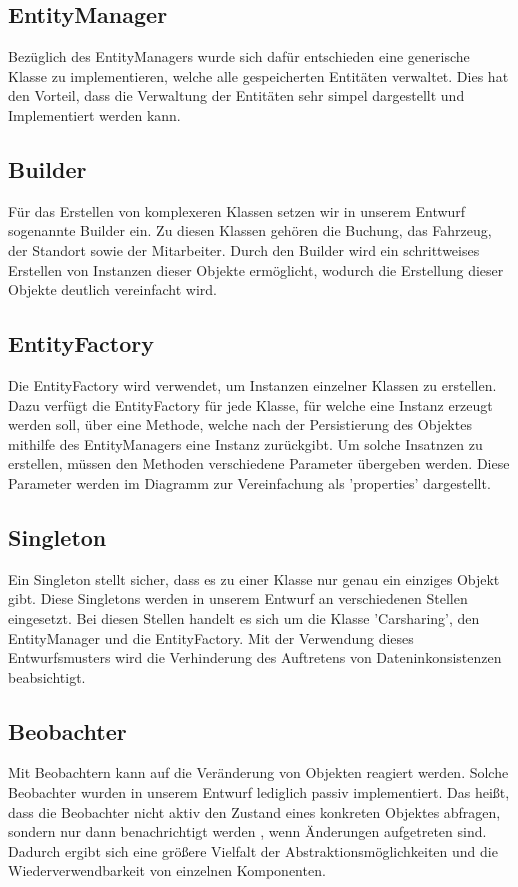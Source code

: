 \subsection{EntityManager}
Bezüglich des EntityManagers wurde sich dafür entschieden eine generische Klasse zu implementieren, welche alle gespeicherten Entitäten verwaltet. Dies hat den Vorteil, dass die Verwaltung der Entitäten sehr simpel dargestellt und Implementiert werden kann.

\subsection{Builder}
Für das Erstellen von komplexeren Klassen setzen wir in unserem Entwurf sogenannte Builder ein. Zu diesen Klassen gehören die Buchung, das Fahrzeug, der Standort sowie der Mitarbeiter. Durch den Builder wird ein schrittweises Erstellen von Instanzen dieser Objekte ermöglicht, wodurch die Erstellung dieser Objekte deutlich vereinfacht wird.

\subsection{EntityFactory}
Die EntityFactory wird verwendet, um Instanzen einzelner Klassen zu erstellen. Dazu verfügt die EntityFactory für jede Klasse, für welche eine Instanz erzeugt werden soll, über eine Methode, welche nach der Persistierung des Objektes mithilfe des EntityManagers eine Instanz zurückgibt. Um solche Insatnzen zu erstellen, müssen den Methoden verschiedene Parameter übergeben werden. Diese Parameter werden im Diagramm zur Vereinfachung als 'properties' dargestellt.

\subsection{Singleton}
Ein Singleton stellt sicher, dass es zu einer Klasse nur genau ein einziges Objekt gibt. Diese Singletons werden in unserem Entwurf an verschiedenen Stellen eingesetzt. Bei diesen Stellen handelt es sich um die Klasse 'Carsharing', den EntityManager und die EntityFactory. Mit der Verwendung dieses Entwurfsmusters wird die Verhinderung des Auftretens von Dateninkonsistenzen beabsichtigt.

\subsection{Beobachter}
Mit Beobachtern kann auf die Veränderung von Objekten reagiert werden. Solche Beobachter wurden in unserem Entwurf lediglich passiv implementiert. Das heißt, dass die Beobachter nicht aktiv den Zustand eines konkreten Objektes abfragen, sondern nur dann benachrichtigt werden , wenn Änderungen aufgetreten sind. Dadurch ergibt sich eine größere Vielfalt der Abstraktionsmöglichkeiten und die Wiederverwendbarkeit von einzelnen Komponenten.

